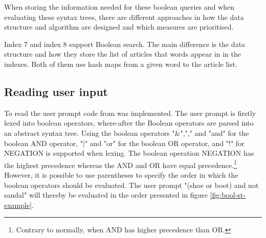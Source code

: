 When storing the information needed for these boolean queries and when evaluating these syntax trees, there are different approaches in how the data structure and algorithm are designed and which measures are prioritised. 

Index 7 and index 8 support Boolean search. The main difference is the data structure and how they store the list of articles that words appear in in the indexes. Both of them use hash maps from a given word to the article list. 

\subsection{Reading user input}
To read the user prompt code from \cite{parsing_lexing} was implemented. The user prompt is firstly lexed into boolean operators, where-after the Boolean operators are parsed into an abstract syntax tree. Using the boolean operators "\&","," and "and" for the boolean AND operator, "|" and "or" for the boolean OR operator, and "!" for NEGATION is supported when lexing. The boolean operation NEGATION has the highest precedence whereas the AND and OR have equal precedence.\footnote{Contrary to normally, when AND has higher precedence than OR.} However, it is possible to use parentheses to specify the order in which the boolean operators should be evaluated. The user prompt "(shoe or boot) and not sandal" will thereby be evaluated in the order presented in figure \ref{fig:bool-st-example}.

